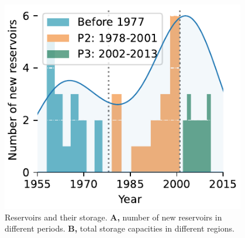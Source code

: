 \documentclass[9pt,twoside,lineno]{pnas-new}
\begin{document}
\begin{figure}
    \centering
    \includegraphics[width=0.95\textwidth]{../../figures/sup/reservoirs.pdf}
    \caption{
        Reservoirs and their storage.
        \textbf{A,} number of new reservoirs in different periods.
        \textbf{B,} total storage capacities in different regions.
    }
\end{figure}


\end{document}
